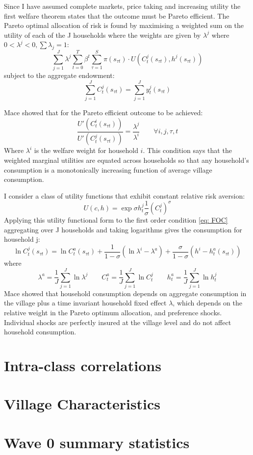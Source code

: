 Since I have assumed complete markets, price taking and increasing utility the first welfare theorem states that the outcome must be Pareto efficient. The Pareto optimal allocation of risk is found by maximising a weighted sum on the utility of each of the J households where the weights are given by $\lambda^j$ where $0 < \lambda^j < 0, \sum\lambda_j=1 $:
\begin{equation} \label{eq: social max}
\sum_{j=1}^J \lambda^j \sum_{t=0}^{T} \beta^t \sum_{\tau=1}^{S}\pi(s_{\tau t})\cdot U(C^j_t(s_{\tau t}),h^j(s_{\tau t}))
\end{equation}
subject to the aggregate endowment:
\begin{equation}
\sum_{j=1}^J C^j_t(s_{\tau t})= \sum_{j=1}^J y_t^j(s_{\tau t})
\end{equation}

Mace showed that for the Pareto efficient outcome to be achieved:
\begin{equation} \label{eq: FOC}
\frac{U'(C^i_t(s_{\tau t}))}{U'(C^j_t(s_{\tau t}))}=\frac{\lambda^j}{\lambda^i} \qquad \forall i, j, \tau, t
\end{equation}
Where $\lambda^i$ is the welfare weight for household $i$. This condition says that the weighted marginal utilities are equated across households so that any household's consumption is a monotonically increasing function of average village consumption. 

I consider a class of utility functions that exhibit constant relative risk aversion: 
\begin{equation}
U(c,h)= \exp{\sigma h^j_t}\frac{1}{\sigma}(C^j_t)^{\sigma}
\end{equation}
Applying this utility functional form to the first order condition \eqref{eq: FOC} aggregating over J households and taking logarithms gives the consumption for household j:
\begin{equation} \label{eq: consumption app}
\ln C_t^j(s_{\tau t}) = \ln C^a_t(s_{\tau t}) + \frac{1}{1-\sigma}(\ln \lambda^i- \lambda^a) + \frac{\sigma}{1-\sigma}(h^i- h^a_t(s_{\tau t}))
\end{equation}
where
\[
\lambda^a=\frac{1}{J} \sum_{j=1}^J \ln \lambda^j \qquad C_t^a=\frac{1}{J} \sum_{j=1}^J \ln C_t^j \qquad h^a_t=\frac{1}{J} \sum_{j=1}^J \ln h_t^j
\]
Mace showed that household consumption depends on aggregate consumption in the village plus a time invariant household fixed effect $\lambda$, which depends on the relative weight in the Pareto optimum allocation, and preference shocks. Individual shocks are perfectly insured at the village level and do not affect household consumption. 
\clearpage
\section{Intra-class correlations}

\clearpage
\section{Village Characteristics} \label{appen_vill}

\clearpage
\section{Wave 0 summary statistics}


